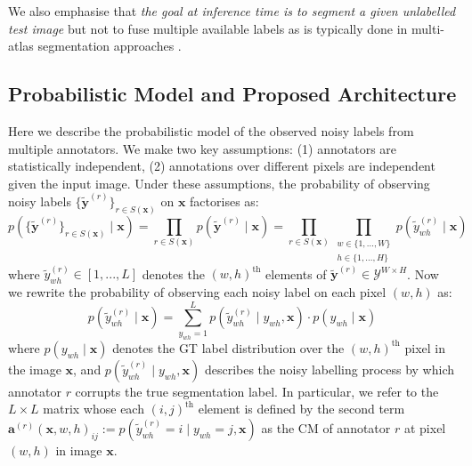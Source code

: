We also emphasise that \textit{the goal at inference time is to segment a given unlabelled test image} but not to fuse multiple available labels as is typically done in multi-atlas segmentation approaches \cite{iglesias2013unified}. 

\vspace{-2mm}
\subsection{Probabilistic Model and Proposed Architecture}
Here we describe the probabilistic model of the observed noisy labels from multiple annotators. We make two key assumptions: (1) annotators are statistically independent, (2) annotations over different pixels are independent given the input image. Under these assumptions, the probability of observing noisy labels $\{\tilde{\textbf{y}}^{(r)}\}_{r\in S(\mathbf{x})}$ on $\textbf{x}$ factorises as:
\begin{equation}
    p(\{\tilde{\textbf{y}}^{(r)}\}_{r\in S(\mathbf{x})}\mid \textbf{x})
    =\prod_{r\in S(\mathbf{x})}p(\tilde{\textbf{y}}^{(r)}\mid \textbf{x})
    = \prod_{r\in S(\mathbf{x})}\prod_{\substack{w\in\{1,...,W\}\\h\in\{1,...,H\}}} p(\tilde{y}^{(r)}_{wh} \mid \textbf{x})
    \label{eq:joint_probs}
\end{equation}
where $\tilde{y}^{(r)}_{wh} \in [1, ..., L]$ denotes the $(w, h)^{\text{th}}$ elements of $\tilde{\textbf{y}}^{(r)}\in \mathcal{Y}^{W\times H}$. Now we rewrite the probability of observing each noisy label on each pixel $(w, h)$ as: 
\begin{equation}
    p(\tilde{y}^{(r)}_{wh}\mid \textbf{x})= \sum_{y_{wh}= 1}^{L} p(\tilde{y}^{(r)}_{wh}\mid y_{wh},\textbf{x}) \cdot  p(y_{wh}\mid \textbf{x}) 
    \label{eq:confusion_matrix}
\end{equation}
where $p(y_{wh}\mid\textbf{x})$ denotes the GT label distribution over the $(w, h)^{\text{th}}$ pixel in the image $\textbf{x}$, and $p(\tilde{y}^{(r)}_{wh}\mid y_{wh},\textbf{x})$ describes the noisy labelling process by which annotator $r$ corrupts the true segmentation label. In particular, we refer to the $L\times L$ matrix whose each $(i,j)^{\text{th}}$ element is defined by the second term $\textbf{a}^{(r)}(\mathbf{x},w,h)_{ij}:=p(\tilde{y}^{(r)}_{wh}=i\mid y_{wh}=j,\textbf{x})$ as the CM of annotator $r$ at pixel $(w, h)$ in image $\mathbf{x}$. 

